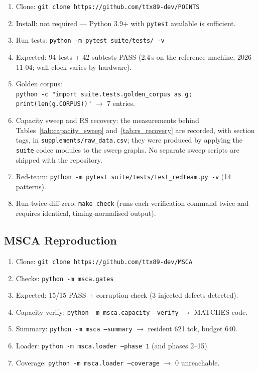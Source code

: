 \begin{enumerate}
\item Clone: \texttt{git clone https://github.com/ttx89-dev/POINTS}
\item Install: not required --- Python 3.9+ with \texttt{pytest} available is sufficient.
\item Run tests: \texttt{python -m pytest suite/tests/ -v}
\item Expected: 94 tests + 42 subtests PASS (2.4\,s on the reference machine, 2026-11-04; wall-clock varies by hardware).
\item Golden corpus:\\ \texttt{python -c "import suite.tests.golden\_corpus as g; print(len(g.CORPUS))"} $\to$ 7 entries.
\item Capacity sweep and RS recovery: the measurements behind Tables~\ref{tab:capacity_sweep} and~\ref{tab:rs_recovery} are recorded, with section tags, in \texttt{supplements/raw\_data.csv}; they were produced by applying the \texttt{suite} codec modules to the sweep graphs. No separate sweep scripts are shipped with the repository.
\item Red-team: \texttt{python -m pytest suite/tests/test\_redteam.py -v} (14 patterns).
\item Run-twice-diff-zero: \texttt{make check} (runs each verification command twice and requires identical, timing-normalised output).
\end{enumerate}

\subsection*{MSCA Reproduction}

\begin{enumerate}
\item Clone: \texttt{git clone https://github.com/ttx89-dev/MSCA}
\item Checks: \texttt{python -m msca.gates}
\item Expected: 15/15 PASS + corruption check (3 injected defects detected).
\item Capacity verify: \texttt{python -m msca.capacity --verify} $\to$ MATCHES code.
\item Summary: \texttt{python -m msca --summary} $\to$ resident 621 tok, budget 640.
\item Loader: \texttt{python -m msca.loader --phase 1} (and phases 2--15).
\item Coverage: \texttt{python -m msca.loader --coverage} $\to$ 0 unreachable.
\end{enumerate}

